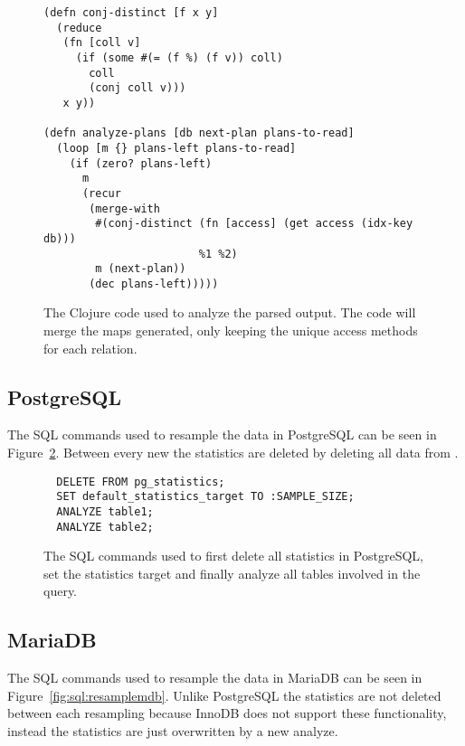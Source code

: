 \begin{figure}[ht]
\begin{verbatim}
(defn conj-distinct [f x y]
  (reduce
   (fn [coll v]
     (if (some #(= (f %) (f v)) coll)
       coll
       (conj coll v)))
   x y))

(defn analyze-plans [db next-plan plans-to-read]
  (loop [m {} plans-left plans-to-read]
    (if (zero? plans-left)
      m
      (recur
       (merge-with
        #(conj-distinct (fn [access] (get access (idx-key db)))
                        %1 %2)
        m (next-plan))
       (dec plans-left)))))
   \end{verbatim}
   \caption[The clojure code to analyze a query]{The Clojure code used to
     analyze the parsed output. The code will merge the maps generated, only
     keeping the unique access methods for each relation.}
\label{fig:clj:analyzing}
\end{figure}

\subsection{PostgreSQL}\label{sec:postgresql}
The SQL commands used to resample the data in PostgreSQL can be seen in
Figure~\ref{fig:sql:pganalyze}. Between every new  the statistics
are deleted by deleting all data from .

\begin{figure}[ht]
\begin{verbatim}
  DELETE FROM pg_statistics;
  SET default_statistics_target TO :SAMPLE_SIZE;
  ANALYZE table1;
  ANALYZE table2;
\end{verbatim}
\caption[The SQL commands used to resample inPostgreSQL.]{The SQL commands used
  to first delete all statistics in PostgreSQL, set the statistics target and
  finally analyze all tables involved in the query.}
\label{fig:sql:pganalyze}
\end{figure}

\subsection{MariaDB}\label{sec:mariadb}
The SQL commands used to resample the data in MariaDB can be seen in
Figure~\ref{fig:sql:resamplemdb}. Unlike PostgreSQL the statistics are not
deleted between each resampling because InnoDB does not support these
functionality, instead the statistics are just overwritten by a new analyze.

